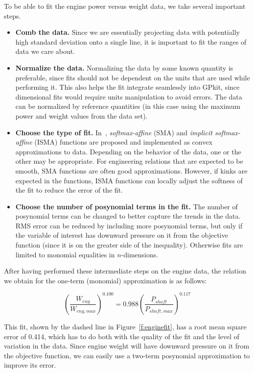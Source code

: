 To be able to fit the engine power versus weight data, we take several important steps.
\begin{itemize}
    \item \textbf{Comb the data.} Since we are essentially projecting
    data with potentially high standard deviation onto a single line,
    it is important to fit the ranges of data we care about.
    \item \textbf{Normalize the data.} Normalizing the data
    by some known quantity is preferable, since fits should not be dependent on the
    units that are used while performing it. This also helps the fit integrate
    seamlessly into GPkit, since dimensional fits would require units manipulation
    to avoid errors. The data can be normalized by
    reference quantities (in this case using the maximum power and weight values
    from the data set).
    \item \textbf{Choose the type of fit.} In~\cite{gpfitpaper}, \textit{softmax-affine}
    (SMA) and \textit{implicit softmax-affine} (ISMA)
    functions are proposed and implemented as convex approximations
    to data. Depending on the behavior of the data, one or the other
    may be appropriate. For engineering relations that are expected to be smooth, SMA
    functions are often good approximations. However, if kinks are expected in the
    functions, ISMA functions can locally adjust the softness of the fit to
    reduce the error of the fit.
    \item \textbf{Choose the number of posynomial terms in the fit.} The number of posynomial
    terms can be changed to better capture the trends in the data.
    RMS error can be reduced by including
    more posynomial terms, but only if the variable of interest has downward
    pressure on it from the objective function (since it is on the greater side
    of the inequality). Otherwise fits are limited to monomial equalities in $n$-dimensions.
\end{itemize}

After having performed these intermediate steps on the engine data,
the relation we obtain for the one-term (monomial) approximation is as follows:

\begin{equation}
    \left(\frac{W_{eng}}{W_{eng,max}}\right)^{0.100} = 0.988 \left(\frac{P_{shaft}}{P_{shaft,max}}\right)^{0.117}
\end{equation}

This fit, shown by the dashed line in Figure~\ref{f:enginefit}, has a root mean square error of 0.414,
which has to do both with the quality of the fit and
the level of variation in the data. Since engine weight will have downward pressure
on it from the objective function, we can easily use a two-term posynomial approximation to
improve its error.


